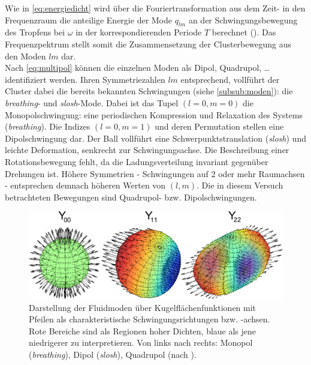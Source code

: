 \documentclass[numbers=noenddot,a4paper,notitlepage,twoside,BCOR15mm]{scrbook}
\newcommand{\tilt}[1]{\textit{#1}}
\begin{document}
					Wie in \autoref{eq:energiedicht} wird \"uber die Fouriertransformation aus dem Zeit- in den Frequenzraum die anteilige Energie der Mode $q_{lm}$ an der Schwingungsbewegung des Tropfens bei $\omega$ in der korrespondierenden Periode  $T$ berechnet (\cite{Schella13}). Das Frequenzpektrum stellt somit die Zusammensetzung der Clusterbewegung aus den Moden $lm$ dar.\\
					Nach \autoref{eq:multipol} k\"onnen die einzelnen Moden als Dipol, Quadrupol, \dots identifiziert werden. Ihren Symmetriezahlen $lm$ entsprechend, vollf\"uhrt der Cluster dabei die bereits bekannten Schwingungen (siehe \ref{subsub:moden}): die \tilt{breathing}- und \tilt{slosh}-Mode. Dabei ist das Tupel $\left(l=0,m=0\right)$ die Monopolschwingung: eine periodischen Kompression und Relaxation des Systems (\tilt{breathing}). Die Indizes $\left(l=0,m=1\right)$ und deren Permutation stellen eine Dipolschwingung dar. Der Ball vollf\"uhrt eine Schwerpunktstranslation (\tilt{slosh}) und leichte Deformation, senkrecht zur Schwingungsachse. Die Beschreibung einer Rotationsbewegung fehlt, da die Ladungsverteilung invariant gegen\"uber Drehungen ist. H\"ohere Symmetrien - Schwingungen auf 2 oder mehr Raumachsen - entsprechen demnach h\"oheren Werten von $\left(l,m\right)$. Die in diesem Versuch betrachteten Bewegungen sind Quadrupol- bzw. Dipolschwingungen.

						\begin{figure}[H]
                            \centering
                            \includegraphics[width=\textwidth,height=0.375\textwidth]{figs/y001122.png}
                            \caption{Darstellung der Fluidmoden über Kugelflächenfunktionen mit Pfeilen als charakteristische Schwingungsrichtungen bzw. -achsen. Rote Bereiche sind als Regionen hoher Dichten, blaue als jene niedrigerer zu interpretieren. Von links nach rechts: Monopol (\tilt{breathing}), Dipol (\tilt{slosh}), Quadrupol (nach \cite{Mulsow13}).}
                            \label{img:fluidmode}
                        \end{figure}
\end{document}
